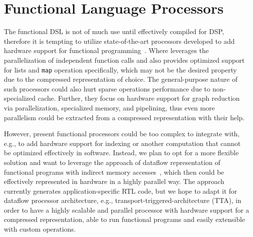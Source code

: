 \documentclass[10pt,conference]{IEEEtran}
\newcommand\todo[1]{{\color{red}#1}}
\begin{document}
\section{Functional Language Processors}
The functional DSL is not of much use until effectively compiled for DSP, therefore it is tempting to utilize state-of-the-art processors developed to  
add hardware support for functional programming~\cite{ACqua,Reduceron,PILGRIM}. Where \cite{ACqua} leverages the parallelization of independent function calls and also
provides optimized support for lists and \texttt{map} operation specifically, which may not be the desired property due to the compressed representation of choice. The general-purpose nature of such processors could also hurt sparse operations performance due to non-specialized cache.
Further, they focus on hardware support for graph reduction via parallelization, specialized memory, and pipelining, thus even more parallelism could be extracted from a compressed representation with their help.

However, present functional processors could be too complex to integrate with, e.g., to add hardware support for indexing or another computation that cannot be optimized effectively in software. 
Instead, we plan to opt for a more flexible solution and want to leverage the approach of dataflow representation of functional programs with indirect memory accesses~\cite{funcHLS}, which then could be effectively represented in hardware in a highly parallel way. 
The approach currently generates application-specific RTL code, but we hope to adapt it for dataflow processor architecture, e.g., transport-triggered-architecture (TTA), in order to have a highly scalable and parallel processor with hardware support for a compressed representation, able to run functional programs and easily extensible with custom operations. 

\end{document}

